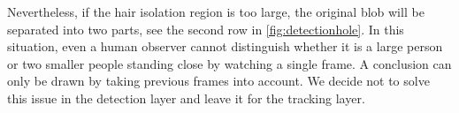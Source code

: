 Nevertheless, if the hair isolation region is too large, the original blob will be separated into two parts, see the second row in \autoref{fig:detectionhole}. In this situation, even a human observer cannot distinguish whether it is a large person or two smaller people standing close by watching a single frame. A conclusion can only be drawn by taking previous frames into account. We decide not to solve this issue in the detection layer and leave it for the tracking layer. 
